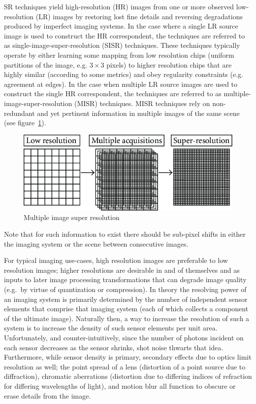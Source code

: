 SR techniques yield high-resolution (HR) images from one or more observed low-resolution (LR) images by restoring lost fine details and reversing degradations produced by imperfect imaging systems.
%
In the case where a single LR source image is used to construct the HR correspondent, the techniques are referred to as single-image-super-resolution (SISR) techniques.
%
These techniques typically operate by either learning some mapping from low resolution chips (uniform partitions of the image, e.g. $3\times 3$ pixels) to higher resolution chips that are highly similar (according to some metrics) and obey regularity constraints (e.g. agreement at edges).
%
In the case when multiple LR source images are used to construct the single HR correspondent, the techniques are referred to as multiple-image-super-resolution (MISR) techniques.
%
MISR techniques rely on non-redundant and yet pertinent information in multiple images of the same scene (see figure~\ref{fig:misr}).
\begin{figure}
    \includegraphics[width=\linewidth,keepaspectratio]{figures/misr.png}
    \caption{Multiple image super resolution\cite{misr}}
    \label{fig:misr}
\end{figure}
%
Note that for such information to exist there should be sub-pixel shifts in either the imaging system or the scene between consecutive images.


For typical imaging use-cases, high resolution images are preferable to low resolution images; higher resolutions are
desirable in and of themselves and as inputs to later image processing transformations that can degrade image quality (e.g.\ by virtue of quantization or compression).
%
In theory the resolving power of an imaging system is primarily determined by the number of independent sensor elements that comprise that imaging system (each of which collects a component of the ultimate image).
%
Naturally then, a way to increase the resolution of such a system is to increase the density of such sensor elements per unit area.
%
Unfortunately, and counter-intuitively, since the number of photons incident on each sensor decreases as the sensor shrinks, shot noise thwarts that idea.
%
Furthermore, while sensor density is primary, secondary effects due to optics limit resolution as well;
the point spread of a lens (distortion of a point source due to diffraction), chromatic aberrations (distortion due to differing indices of refraction for differing wavelengths of light), and motion blur all function to obscure or erase details from the image.

